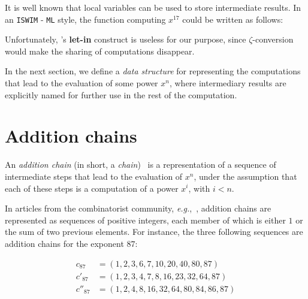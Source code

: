 It is well known that local variables can be used to store intermediate results.
In an \texttt{ISWIM} - \texttt{ML} style, the function computing $x^{17}$ could be written as follows:


\label{pow-17-let-in}

Unfortunately, \coq's \textbf{let-in} construct is useless for our purpose, since $\zeta$-conversion 
would make the sharing of computations disappear.

                                                                                                                                                                                                                                                                                                                                                                                                                                                                                                                                                                                                                                                                                                                        
In the next section, we define a \emph{data structure} for representing 
the computations that lead to the evaluation of some power $x^n$, where
intermediary results are explicitly named for further use in the rest of the computation.




\section{Addition chains}
An \emph{addition chain} (in short, a \emph{chain})~\cite{brauer1939} is a representation of a sequence of
intermediate steps that lead to the evaluation of  $x^n$, under the 
assumption that each of these steps is a computation of  a power $x^i$, with 
$i<n$.

In articles from the combinatorist  community, 
\emph{e.g.},~\cite{brauer1939,DBLP:journals/ipl/BerstelB87},  addition chains
are represented as sequences of positive integers, each member of which 
is either $1$ or  the sum of two previous elements.
For instance, the three following sequences are addition chains for the exponent $87$:

\begin{align}
c_{87} &= (1,2,3,6,7,10,20,40,80,87) \\
c'_{87}&=(1,2,3,4,7,8,16,23,32,64,87) \\
c''_{87}&=(1,2,4,8,16,32,64,80,84,86,87)
\end{align}

